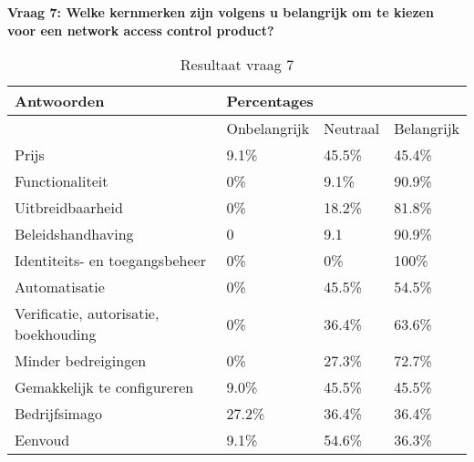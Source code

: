 \textbf{Vraag 7: Welke kernmerken zijn volgens u belangrijk om te kiezen voor een network access control product?}
\begin{table}[h!]
	\begin{center}
		\begin{tabular}{|l|l|l|l|}
			\hline
			\bf Antwoorden          & \multicolumn{3}{l|}{\bf Percentages} \\ \hline
					 			  				  & Onbelangrijk & Neutraal & Belangrijk \\ \hline
			Prijs                                 & 9.1\%        & 45.5\%   & 45.4\%     \\ \hline
			Functionaliteit                       & 0\%          & 9.1\%    & 90.9\%     \\ \hline
			Uitbreidbaarheid                      & 0\%          & 18.2\%   & 81.8\%     \\ \hline
			Beleidshandhaving                     & 0            & 9.1      & 90.9\%     \\ \hline
			Identiteits- en toegangsbeheer        & 0\%          & 0\%      & 100\%      \\ \hline
			Automatisatie                         & 0\%          & 45.5\%   & 54.5\%     \\ \hline
			Verificatie, autorisatie, boekhouding & 0\%          & 36.4\%   & 63.6\%     \\ \hline
			Minder bedreigingen                   & 0\%          & 27.3\%   & 72.7\%     \\ \hline
			Gemakkelijk te configureren           & 9.0\%        & 45.5\%   & 45.5\%     \\ \hline
			Bedrijfsimago                         & 27.2\%       & 36.4\%   & 36.4\%     \\ \hline
			Eenvoud                               & 9.1\%        & 54.6\%   & 36.3\%     \\ \hline
		\end{tabular}
		\caption{Resultaat vraag 7}
	\end{center}
\end{table}



